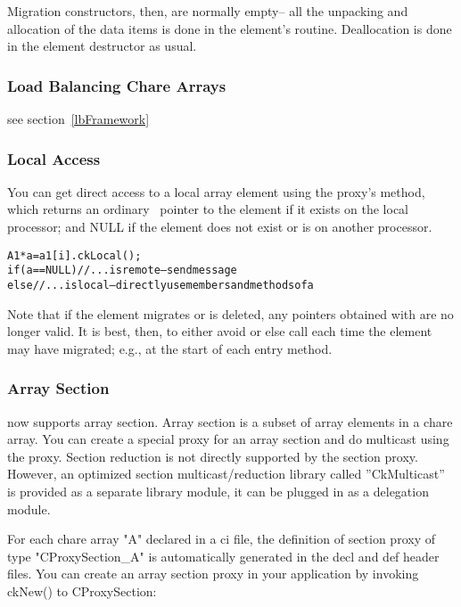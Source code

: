 Migration constructors, then, are normally empty-- all the unpacking
and allocation of the data items is done in the element's  routine.
Deallocation is done in the element destructor as usual.


\subsubsection{Load Balancing Chare Arrays}
see section~\ref{lbFramework}


\subsubsection{Local Access}
\experimental{}
\label{ckLocal for arrays}
You can get direct access to a local array element using the
proxy's  method, which returns an ordinary \CC\ pointer
to the element if it exists on the local processor; and NULL if
the element does not exist or is on another processor.

\begin{alltt}
A1 *a=a1[i].ckLocal();
if (a==NULL) //...is remote-- send message
else //...is local-- directly use members and methods of a
\end{alltt}

Note that if the element migrates or is deleted, any pointers 
obtained with  are no longer valid.  It is best,
then, to either avoid  or else call  
each time the element may have migrated; e.g., at the start 
of each entry method.


\subsubsection{Array Section}
\experimental{}

\charmpp{} now supports array section. Array section is a subset of array 
elements in a chare array. You can create a special proxy for an array section 
and do multicast using the proxy. Section reduction is not directly supported 
by the section proxy. However, an optimized section multicast/reduction 
library called ''CkMulticast'' is provided as a separate library module,
it can be plugged in as a delegation module. 

For each chare array "A" declared in a ci file, the definition of section proxy 
of type "CProxySection\_A" is automatically generated in the decl and def 
header files. You can create an array section proxy in your application by 
invoking ckNew() to CProxySection:

